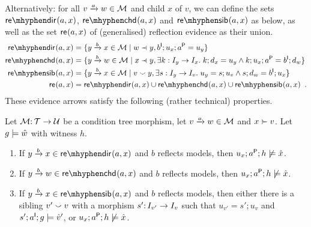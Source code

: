 Alternatively: for all $\trip vaw\in\cM$ and child $x$ of $v$, we can define the sets $\redir{a,x}$, $\rechd{a,x}$ and $\resib{a,x}$ as below, as well as the set $\mathsf{re}_{}(a,x)$ of (generalised) reflection evidence as their union.
%
\begin{align*}
\redir{a,x} ={} & \gensetof{\trip ybx\in \cM}{w\parentof y, b\I;u_x;a\P=u_y} \\
\rechd{a,x} ={} & \gensetof{\trip ybw\in \cM}{x\parentof y, \exists k:I_y\to I_x\st k;d_x=u_y\wedge k;u_x;a\P=b\I;d_w} \\
\resib{a,x} ={} & \gensetof{\trip ybx\in \cM}{v\sibling y, \exists s:I_y\to I_v\st u_y=s;u_v \wedge s;d_w=b\I;u_x} \\
\re{a,x} ={} & \redir{a,x}\cup \rechd{a,x} \cup \resib{a,x} \enspace.
\end{align*}
%
These evidence arrows satisfy the following (rather technical) properties.
%
\begin{lemma}\label{lem:evidence}
Let  ${\mathcal{M}}{:}\, {\mathcal{T}}\rightarrow{\mathcal{U}}$ be a condition tree morphism, let $\trip vaw\in\cM$ and $x\childof v$. Let $g\models \hat w$ with witness $h$.
\begin{enumerate}
\item\label{re-dir} If $\trip ybx\in \redir{a,x}$ and $b$ reflects models, then $u_x;a^{\mathsf P};h\not\models \hat x$.
\item\label{re-chd} If $\trip ybw\in \rechd{a,x}$ and $b$ reflects models, then $u_x;a^{\mathsf P};h\not\models \hat x$.
\item\label{re-sib} If $\trip ybx\in \resib{a,x}$ and $b$ reflects models, then either there is a sibling $v'\smallsmile v$ with a morphism $s'{:}\, I_{v'}\rightarrow I_v$ such that $u_{v'}=s';u_v$ and $s';a^{\mathsf I};g\models \hat v'$, or $u_x;a^{\mathsf P};h\not\models \hat x$.
\end{enumerate}
\end{lemma}
%
